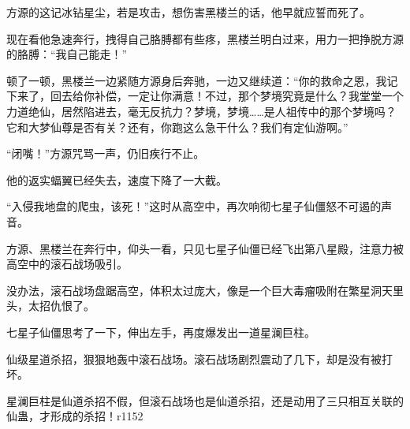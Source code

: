 \begin{this_body}
方源的这记冰钻星尘，若是攻击，想伤害黑楼兰的话，他早就应誓而死了。

现在看他急速奔行，拽得自己胳膊都有些疼，黑楼兰明白过来，用力一把挣脱方源的胳膊：“我自己能走！”

顿了一顿，黑楼兰一边紧随方源身后奔驰，一边又继续道：“你的救命之恩，我记下来了，回去给你补偿，一定让你满意！不过，那个梦境究竟是什么？我堂堂一个力道绝仙，居然陷进去，毫无反抗力？梦境，梦境……是人祖传中的那个梦境吗？它和大梦仙尊是否有关？还有，你跑这么急干什么？我们有定仙游啊。”

“闭嘴！”方源咒骂一声，仍旧疾行不止。

他的返实蝠翼已经失去，速度下降了一大截。

“入侵我地盘的爬虫，该死！”这时从高空中，再次响彻七星子仙僵怒不可遏的声音。

方源、黑楼兰在奔行中，仰头一看，只见七星子仙僵已经飞出第八星殿，注意力被高空中的滚石战场吸引。

没办法，滚石战场盘踞高空，体积太过庞大，像是一个巨大毒瘤吸附在繁星洞天里头，太招仇恨了。

七星子仙僵思考了一下，伸出左手，再度爆发出一道星澜巨柱。

仙级星道杀招，狠狠地轰中滚石战场。滚石战场剧烈震动了几下，却是没有被打坏。

星澜巨柱是仙道杀招不假，但滚石战场也是仙道杀招，还是动用了三只相互关联的仙蛊，才形成的杀招！r1152

\end{this_body}


